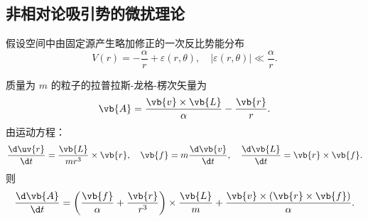 \subsection{非相对论吸引势的微扰理论}
假设空间中由固定源产生略加修正的一次反比势能分布
\begin{equation*}
	V(r) = -\dfrac{\alpha}{r} + \varepsilon(r, \theta),\quad |\varepsilon(r, \theta)| \ll \dfrac{\alpha}{r}.
\end{equation*}

质量为 \(m\) 的粒子的拉普拉斯-龙格-楞次矢量为
\begin{equation*}
	\vb{A} = \dfrac{\vb{v} \times \vb{L}}{\alpha} - \dfrac{\vb{r}}{r}.
\end{equation*}
由运动方程：
\begin{equation*}
	\dfrac{\d \uv{r}}{\d t} = \dfrac{\vb{L}}{m r^3} \times \vb{r}, \quad
	\vb{f} = m \dfrac{\d \vb{v}}{\d t}, \quad
	\dfrac{\d \vb{L}}{\d t} = \vb{r} \times \vb{f}.
\end{equation*}
则
\begin{equation*}
	\dfrac{\d \vb{A}}{\d t} = \left( \dfrac{\vb{f}}{\alpha} + \dfrac{\vb{r}}{r^3} \right) \times \dfrac{\vb{L}}{m} + \dfrac{\vb{v} \times (\vb{r} \times \vb{f})}{\alpha}.
\end{equation*}

